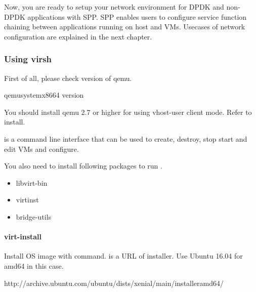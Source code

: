 \documentclass[a4paper,11pt,openany,oneside,english]{sphinxmanual}
\begin{document}
Now, you are ready to setup your network environment for DPDK and non-DPDK
applications with SPP.
SPP enables users to configure service function chaining between applications
running on host and VMs.
Usecases of network configuration are explained in the next chapter.


\subsubsection{Using virsh}
\label{\detokenize{gsg/howto_use:using-virsh}}\label{\detokenize{gsg/howto_use:spp-gsg-howto-virsh}}
First of all, please check version of qemu.

\begin{sphinxVerbatim}[commandchars=\\\{\},formatcom=\footnotesize]
 qemu\PYGZhy{}system\PYGZhy{}x86\PYGZus{}64 \PYGZhy{}\PYGZhy{}version
\end{sphinxVerbatim}

You should install qemu 2.7 or higher for using vhost-user client mode.
Refer 
to install.

 is a command line interface that can be used to create, destroy,
stop start and edit VMs and configure.

You also need to install following packages to run .
\begin{itemize}
\item {} 
libvirt-bin

\item {} 
virtinst

\item {} 
bridge-utils

\end{itemize}


\paragraph{virt-install}
\label{\detokenize{gsg/howto_use:virt-install}}
Install OS image with  command.
 is a URL of installer. Use Ubuntu 16.04 for amd64 in this
case.

\begin{sphinxVerbatim}[commandchars=\\\{\},formatcom=\footnotesize]
http://archive.ubuntu.com/ubuntu/dists/xenial/main/installer\PYGZhy{}amd64/
\end{sphinxVerbatim}
\end{document}
